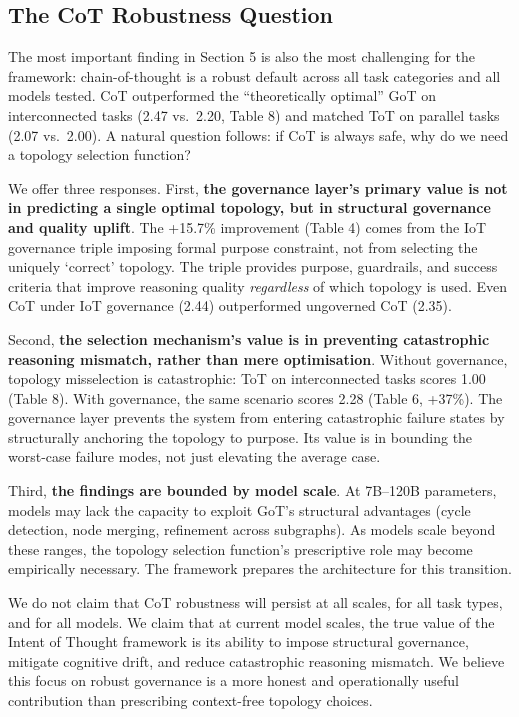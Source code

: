 \documentclass[11pt,a4paper]{article}
\begin{document}
\subsection{The CoT Robustness
Question}\label{the-cot-robustness-question}

The most important finding in Section 5 is also the most challenging for
the framework: chain-of-thought is a robust default across all task
categories and all models tested. CoT outperformed the ``theoretically
optimal'' GoT on interconnected tasks (2.47 vs.~2.20, Table 8) and
matched ToT on parallel tasks (2.07 vs.~2.00). A natural question
follows: if CoT is always safe, why do we need a topology selection
function?

We offer three responses. First, \textbf{the governance layer's primary
value is not in predicting a single optimal topology, but in structural
governance and quality uplift}. The +15.7\% improvement (Table 4) comes
from the IoT governance triple imposing formal purpose constraint, not
from selecting the uniquely `correct' topology. The triple provides
purpose, guardrails, and success criteria that improve reasoning quality
\emph{regardless} of which topology is used. Even CoT under IoT
governance (2.44) outperformed ungoverned CoT (2.35).

Second, \textbf{the selection mechanism's value is in preventing
catastrophic reasoning mismatch, rather than mere optimisation}. Without
governance, topology misselection is catastrophic: ToT on interconnected
tasks scores 1.00 (Table 8). With governance, the same scenario scores
2.28 (Table 6, +37\%). The governance layer prevents the system from
entering catastrophic failure states by structurally anchoring the
topology to purpose. Its value is in bounding the worst-case failure
modes, not just elevating the average case.

Third, \textbf{the findings are bounded by model scale}. At 7B--120B
parameters, models may lack the capacity to exploit GoT's structural
advantages (cycle detection, node merging, refinement across subgraphs).
As models scale beyond these ranges, the topology selection function's
prescriptive role may become empirically necessary. The framework
prepares the architecture for this transition.

We do not claim that CoT robustness will persist at all scales, for all
task types, and for all models. We claim that at current model scales,
the true value of the Intent of Thought framework is its ability to
impose structural governance, mitigate cognitive drift, and reduce
catastrophic reasoning mismatch. We believe this focus on robust
governance is a more honest and operationally useful contribution than
prescribing context-free topology choices.
\end{document}
